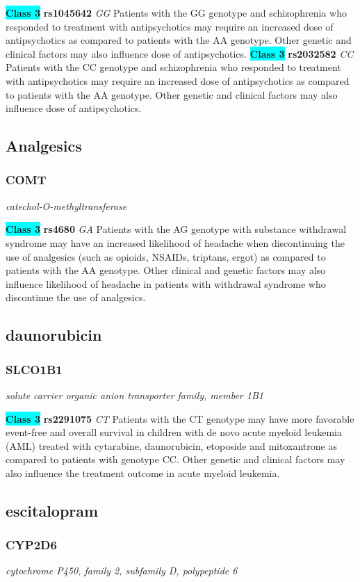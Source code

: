 \documentclass{report}
\begin{document}
\textbf{\colorbox{cyan} {Class 3}} \textbf{ rs1045642 } \textit{ GG }
Patients with the GG genotype and schizophrenia who responded to treatment with antipsychotics may require an increased dose of antipsychotics as compared to patients with the AA genotype. Other genetic and clinical factors may also influence dose of antipsychotics. \newline\textbf{\colorbox{cyan} {Class 3}} \textbf{ rs2032582 } \textit{ CC }
Patients with the CC genotype and schizophrenia who responded to treatment with antipsychotics may require an increased dose of antipsychotics as compared to patients with the AA genotype. Other genetic and clinical factors may also influence dose of antipsychotics.\newline\subsection{ Analgesics }\subsubsection{ COMT }
\textit{ catechol-O-methyltransferase }

\textbf{\colorbox{cyan} {Class 3}} \textbf{ rs4680 } \textit{ GA }
Patients with the AG genotype with substance withdrawal syndrome may have an increased likelihood of headache when discontinuing the use of analgesics (such as opioids, NSAIDs, triptans, ergot) as compared to patients with the AA genotype. Other clinical and genetic factors may also influence likelihood of headache in patients with withdrawal syndrome who discontinue the use of analgesics.\newline\subsection{ daunorubicin }\subsubsection{ SLCO1B1 }
\textit{ solute carrier organic anion transporter family, member 1B1 }

\textbf{\colorbox{cyan} {Class 3}} \textbf{ rs2291075 } \textit{ CT }
Patients with the CT genotype may have more favorable event-free and overall survival in children with de novo acute myeloid leukemia (AML) treated with cytarabine, daunorubicin, etoposide and mitoxantrone as compared to patients with genotype CC. Other genetic and clinical factors may also influence the treatment outcome in acute myeloid leukemia.\newline\subsection{ escitalopram }\subsubsection{ CYP2D6 }
\textit{ cytochrome P450, family 2, subfamily D, polypeptide 6 }
\end{document}
